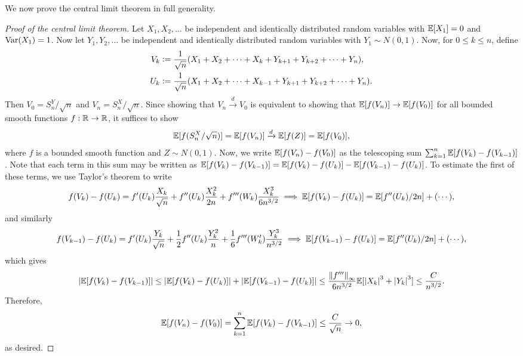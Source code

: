 We now prove the central limit theorem in full generality.
\begin{proof}[Proof of the central limit theorem]
    Let $X_{1},X_{2},\ldots$ be independent and identically distributed random variables with $\mathbb{E}[X_{1}]=0$ and $\operatorname{Var}(X_{1})=1$. Now let $Y_{1},Y_{2},\ldots$ be independent and identically distributed random variables with $Y_{1}\sim N(0,1)$. Now, for $0 \leq k \leq n$, define
    \begin{align}
        V_{k} &\vcentcolon= \frac{1}{\sqrt{n}}(X_{1}+X_{2}+\cdots+X_{k}+Y_{k+1}+Y_{k+2}+\cdots+Y_{n}), \\ U_{k} &\vcentcolon= \frac{1}{\sqrt{n}}(X_{1}+X_{2}+\cdots+X_{k-1} + Y_{k+1}+Y_{k+2}+\cdots+Y_{n}).
    \end{align}
    Then $V_{0} = S_{n}^{Y}/\sqrt{n}$ and $V_{n} = S_{n}^{X}/\sqrt{n}$. Since showing that $V_{n} \xrightarrow{d} V_{0}$ is equivalent to showing that $\mathbb{E}[f(V_{n})] \to \mathbb{E}[f(V_{0})]$ for all bounded smooth functions $f:\mathbb{R} \to \mathbb{R}$, it suffices to show
    \begin{align}
        \mathbb{E}[f(S_{n}^{X}/\sqrt{n})] = \mathbb{E}[f(V_{n})] \xrightarrow{d} \mathbb{E}[f(Z)] = \mathbb{E}[f(V_{0})],
    \end{align}
    where $f$ is a bounded smooth function and $Z \sim N(0,1)$. Now, we write $\mathbb{E}[f(V_{n})-f(V_{0})]$ as the telescoping sum $\sum_{k=1}^{n} \mathbb{E}[f(V_{k})-f(V_{k-1})]$. Note that each term in this sum may be written as $\mathbb{E}[f(V_{k})-f(V_{k-1})] = \mathbb{E}[f(V_{k})-f(U_{k})] - \mathbb{E}[f(V_{k-1})-f(U_{k})]$. To estimate the first of these terms, we use Taylor's theorem to write
    \begin{align}
        f(V_{k})-f(U_{k}) = f'(U_{k})\frac{X_{k}}{\sqrt{n}} + f''(U_{k})\frac{X_{k}^{2}}{2n} + f'''(W_{k})\frac{X_{k}^{3}}{6n^{3/2}} \implies \mathbb{E}[f(V_{k})-f(U_{k})] = \mathbb{E}[f''(U_{k})/2n] + (\cdots),
    \end{align}
    and similarly
    \begin{align}
        f(V_{k-1})-f(U_{k}) = f'(U_{k})\frac{Y_{k}}{\sqrt{n}} + \frac{1}{2}f''(U_{k})\frac{Y_{k}^{2}}{n} + \frac{1}{6}f'''(W'_{k})\frac{Y_{k}^{3}}{n^{3/2}} \implies \mathbb{E}[f(V_{k-1})-f(U_{k})] = \mathbb{E}[f''(U_{k})/2n] + (\cdots),
    \end{align}
    which gives
    \begin{align}
        \left| \mathbb{E}[f(V_{k})-f(V_{k-1})] \right| \leq \left| \mathbb{E}[f(V_{k})-f(U_{k})] \right| + \left| \mathbb{E}[f(V_{k-1})-f(U_{k})] \right| \leq \frac{\left\lVert f'''\right\rVert_{\infty}}{6n^{3/2}}\mathbb{E}[\left| X_{k} \right|^{3}+\left| Y_{k} \right|^{3}] \leq \frac{C}{n^{3/2}}.
    \end{align}
    Therefore,
    \begin{align}
        \mathbb{E}[f(V_{n})-f(V_{0})] = \sum_{k=1}^{n} \mathbb{E}[f(V_{k})-f(V_{k-1})] \leq \frac{C}{\sqrt{n}} \to 0,
    \end{align}
    as desired.
\end{proof}

